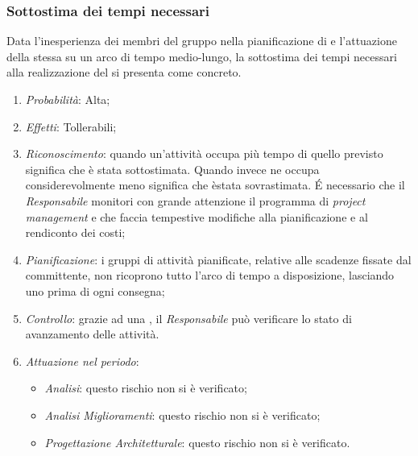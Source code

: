 \subsubsection{Sottostima dei tempi necessari}
Data l'inesperienza dei membri del gruppo nella pianificazione di  e l'attuazione della stessa su un arco di tempo medio-lungo, la sottostima dei tempi necessari alla realizzazione del  si presenta come  concreto.
\begin{enumerate}
\item \textit{Probabilit\`a}: Alta;
\item \textit{Effetti}: Tollerabili;
\item \textit{Riconoscimento}: quando un’attività occupa più tempo di quello previsto significa che è stata sottostimata. Quando invece ne occupa considerevolmente meno significa che èstata sovrastimata. É necessario che il \textit{Responsabile} monitori con grande attenzione il programma di \textit{project management} e che faccia tempestive modifiche alla pianificazione e al rendiconto dei costi;
\item \textit{Pianificazione}: i gruppi di attivit\`a pianificate, relative alle scadenze fissate dal committente, non ricoprono tutto l'arco di tempo a disposizione, lasciando uno  prima di ogni consegna;
\item \textit{Controllo}: grazie ad una , il \textit{Responsabile} pu\`o verificare lo stato di avanzamento delle attivit\`a.
\item \textit{Attuazione nel periodo}: 
	\begin{itemize}
	\item \textit{Analisi}: questo rischio non si è verificato;
	\item \textit{Analisi Miglioramenti}: questo rischio non si è verificato;
	\item \textit{Progettazione Architetturale}: questo rischio non si è verificato.
	\end{itemize}
\end{enumerate}

